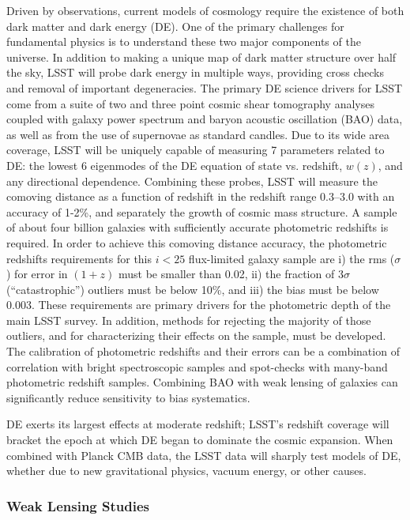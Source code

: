 Driven by observations, current models of cosmology require the existence
of both dark matter and dark energy (DE). One of the primary challenges for
fundamental physics is to understand these two major components of the
universe. In addition to making a unique map of dark matter structure over
half the sky, LSST will probe dark energy in multiple ways, providing cross
checks and removal of important degeneracies.
The primary DE science drivers for LSST come from a suite of two
and three point cosmic shear tomography analyses coupled with galaxy power
spectrum and baryon acoustic oscillation (BAO) data, as well as from the
use of supernovae as standard candles. Due to its wide area coverage, LSST
will be uniquely capable of measuring 7 parameters related to DE:
the lowest 6 eigenmodes of the DE equation of state vs. redshift, $w(z)$, and
any directional dependence.
Combining these probes, LSST will measure the comoving distance as a function
of redshift in the redshift range 0.3--3.0 with an accuracy of 1-2\%, and
separately the growth of cosmic mass structure.
A sample of about four billion galaxies with sufficiently accurate photometric
redshifts is required. In order to achieve this comoving distance accuracy,
the photometric redshifts requirements for this $i<25$
flux-limited galaxy sample are i) the rms ($\sigma$) for error in $(1+z)$ must be
smaller than 0.02, ii) the fraction of $3\sigma$ (``catastrophic'') outliers must be
below 10\%, and iii) the bias must be below 0.003. These requirements are
primary drivers for the photometric depth of the main LSST survey. In addition,
methods for rejecting the majority of those outliers, and for characterizing their
effects on the sample, must be developed. The calibration of photometric redshifts
and their errors can be a combination of correlation with bright spectroscopic samples
and spot-checks with many-band photometric redshift samples. Combining BAO with
weak lensing of galaxies can significantly reduce sensitivity to bias systematics.

DE exerts its largest effects at moderate
redshift; LSST's redshift coverage will bracket the epoch at which DE began
to dominate the cosmic expansion. When combined with Planck CMB data, the
LSST data will sharply test models of DE, whether due to new
gravitational physics, vacuum energy, or other causes.




\subsubsection{Weak Lensing Studies}
\label{WLstudies}

